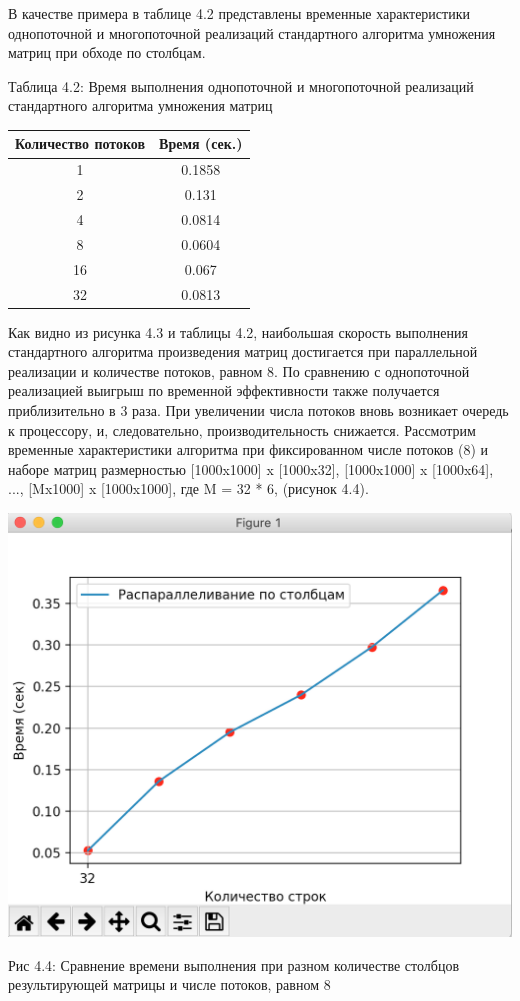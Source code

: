 \documentclass[12pt]{report}
\begin{document}
В качестве примера в таблице 4.2 представлены временные характеристики однопоточной и многопоточной реализаций стандартного алгоритма умножения матриц при обходе по столбцам.

\begin{center}
	\centering
	\caption{Таблица 4.2: Время выполнения однопоточной и многопоточной реализаций стандартного алгоритма умножения матриц}
	\begin{tabular}{|c c|}
		\hline
		Количество потоков & Время  (сек.) \\ [0.5ex] 
 		\hline\hline
		1 & 0.1858\\
 		\hline
 		2 & 0.131\\
 		\hline
 		4 & 0.0814\\
 		\hline
		8 & 0.0604\\
		\hline
		16 & 0.067\\
		\hline
		32 & 0.0813\\
		\hline
		\end{tabular}
\end{center} 

Как видно из рисунка 4.3 и таблицы 4.2, наибольшая скорость выполнения стандартного алгоритма произведения матриц достигается при параллельной реализации и количестве потоков, равном 8. По сравнению с однопоточной реализацией выигрыш по временной эффективности также получается приблизительно в 3 раза. При увеличении числа потоков вновь возникает очередь к процессору, и, следовательно, производительность снижается.
Рассмотрим временные характеристики алгоритма при фиксированном числе потоков (8) и наборе матриц размерностью [1000x1000] x [1000x32], [1000x1000] x [1000x64], ..., [Mx1000] x [1000x1000], где M = 32 * 6, (рисунок 4.4).

\begin{center}
		\includegraphics[scale=0.6]{pics/Parallel4.png}
		
			Рис 4.4: Сравнение времени выполнения при разном количестве столбцов результирующей матрицы и числе потоков, равном 8
\end{center}
\end{document}
